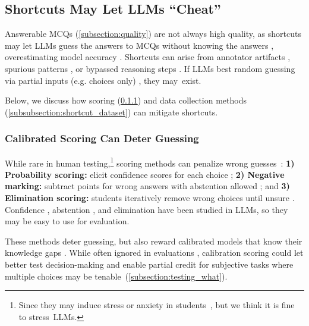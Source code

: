\subsection{\mcqa Shortcuts May Let LLMs ``Cheat''} \label{subsection:artifacts}

Answerable MCQs (\cref{subsection:quality}) are not always high quality, as shortcuts may let LLMs guess the answers to MCQs without knowing the answers \cite{10.1145/3596490}, overestimating model accuracy \cite{wiegreffe2021teach}.
%
Shortcuts can arise from annotator artifacts \cite{gururangan2018annotation}, spurious patterns \cite{zhou2023explore}, or bypassed reasoning steps \cite{chen2019understanding}.
%
If LLMs best random guessing via partial inputs (e.g. choices only) \cite{richardson2020does}, they may~exist.

Below, we discuss how scoring (\cref{subsubsection:shortcut_scoring})
and data collection methods (\cref{subsubsection:shortcut_dataset})
can mitigate shortcuts.


\subsubsection{Calibrated Scoring Can Deter Guessing} \label{subsubsection:shortcut_scoring}

While rare in human testing,\footnote{Since
they may induce stress or anxiety in students~\cite{vanderoost2018elimination},
but we think it is fine to stress~LLMs.} scoring methods can
penalize wrong guesses~\cite{lau2011guessing}:
\textbf{1) Probability scoring:} elicit confidence scores for each choice \cite{finetti1965methods}; \textbf{2) Negative marking:} subtract points for wrong answers with abstention allowed \cite{holt2006analysis}; and \textbf{3) Elimination scoring:} students iteratively remove wrong choices until unsure \cite{ben1997comparative}.
Confidence \cite{li-etal-2024-think}, abstention \cite{goral2024wait}, and elimination \cite{ma2023poe} have been studied in LLMs, so they may be easy to use for \mcqa evaluation.

These methods deter guessing, but also reward calibrated models that know their knowledge gaps \cite{guo2017calibration}.
While often ignored in evaluations \cite{bommasani2023holistic},
calibration scoring could let \mcqa better test decision-making \cite{liu2024dellma} and enable partial credit for subjective tasks where multiple choices may be tenable~(\cref{subsection:testing_what}).



